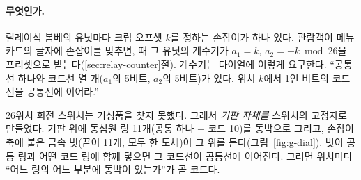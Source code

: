 \paragraph{무엇인가.} 릴레이식 봄베의 유닛마다 크립 오프셋 $k$를 정하는 손잡이가 하나 있다. 관람객이 메뉴
카드의 글자에 손잡이를 맞추면,  때 그 유닛의 계수기가 $a_1 = k$, $a_2 = -k \bmod 26$을 프리셋으로
받는다(\ref{sec:relay-counter}절). 계수기는 다이얼에 이렇게 요구한다. ``공통선 하나와 코드선 열 개(\(a_1\)의 5비트,
\(a_2\)의 5비트)가 있다. 위치 $k$에서 1인 비트의 코드선을 공통선에 이어라.''

26위치 회전 스위치는 기성품을 찾지 못했다. 그래서 \emph{기판 자체를} 스위치의 고정자로 만들었다. 기판 위에 동심원
링 11개(공통 하나 + 코드 10)를 동박으로 그리고, 손잡이 축에 붙은 금속 빗(끝이 11개, 모두 한 도체)이 그 위를
돈다(그림~\ref{fig:g-dial}). 빗이 공통 링과 어떤 코드 링에 함께 닿으면 그 코드선이 공통선에 이어진다. 그러면
위치마다 ``어느 링의 어느 부분에 동박이 있는가''가 곧 코드다.

